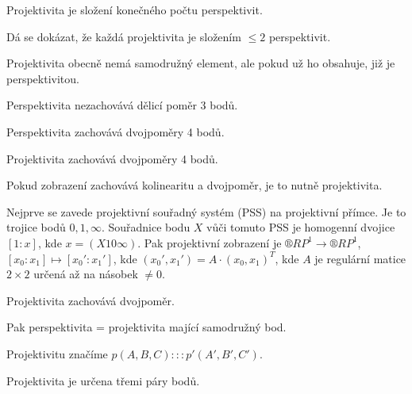 \documentclass[12pt]{article}					%
\begin{document}
\begin{definice}[Projektivita]
	Projektivita je složení konečného počtu perspektivit.

	\begin{poznamkain}
		Dá se dokázat, že každá projektivita je složením $≤ 2$ perspektivit.
	\end{poznamkain}
\end{definice}

\begin{dusledek}
	Projektivita obecně nemá samodružný element, ale pokud už ho obsahuje, již je perspektivitou.
\end{dusledek}

\begin{upozorneni}
	Perspektivita nezachovává dělicí poměr 3 bodů.
\end{upozorneni}

\begin{tvrzeni}
	Perspektivita zachovává dvojpoměry 4 bodů.
\end{tvrzeni}

\begin{dusledek}
	Projektivita zachovává dvojpoměry 4 bodů.
\end{dusledek}

\begin{tvrzeni}
	Pokud zobrazení zachovává kolinearitu a dvojpoměr, je to nutně projektivita.
\end{tvrzeni}

\begin{poznamka}
	Nejprve se zavede projektivní souřadný systém (PSS) na projektivní přímce. Je to trojice bodů $0, 1, ∞$. Souřadnice bodu $X$ vůči tomuto PSS je homogenní dvojice $[1:x]$, kde $x = (X 1 0 ∞)$. Pak projektivní zobrazení je $®RP^1 \rightarrow ®RP^1$, $[x_0:x_1] \mapsto [x_0':x_1']$, kde $(x_0', x_1') = A·(x_0, x_1)^T$, kde $A$ je regulární matice $2 \times 2$ určená až na násobek $≠0$.

	\begin{dusledekin}
		Projektivita zachovává dvojpoměr.
	\end{dusledekin}

	Pak perspektivita = projektivita mající samodružný bod.
\end{poznamka}

\begin{poznamka}
	Projektivitu značíme $p(A, B, C) ::: p'(A', B', C')$.

	\begin{poznamkain}
		Projektivita je určena třemi páry bodů.
	\end{poznamkain}
\end{poznamka}
\end{document}
